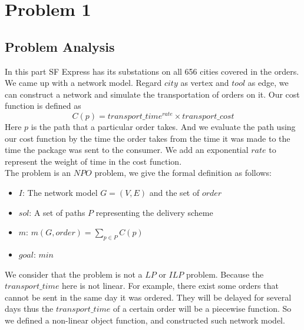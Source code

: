 \documentclass{llncs}
\begin{document}
\section{Problem 1}
\subsection{Problem Analysis}
In this part SF Express has its substations on all 656 cities covered in the orders. We came up with a network model. Regard $city$ as vertex and $tool$ as edge, 
we can construct a network and simulate the transportation of orders on it. Our cost function is defined as $$C(p)=transport\_time^{rate}  \times transport\_cost$$
Here $p$ is the path that a particular order takes. And we evaluate the path using our cost function by the time the order takes from the time it was made to the time the 
package was sent to the consumer. We add an exponential $rate$ to represent the weight of time in the cost function. \\
The problem is an $NPO$ problem, we give the formal definition as follows:
\begin{itemize}
  \item $I$: The network model $G=(V,E)$ and the set of $order$
  \item $sol$: A set of paths $P$ representing the delivery scheme
  \item $m$: $m(G,order)=\sum_{p \in P}C(p)$
  \item $goal$: $min$
\end{itemize}
We consider that the problem is not a $LP$ or $ILP$ problem. Because the $transport\_time$ here is not linear. For example, there exist some orders that cannot be sent in the same day it was ordered. 
They will be delayed for several days thus the $transport\_time$ of a certain order will be a piecewise function.
So we defined a non-linear object function, and constructed such network model.
\end{document}
